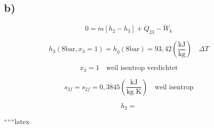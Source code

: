

\subsection*{b)}

\[
0 = \dot{m} \left[ h_2 - h_3 \right] + \dot{Q}_{23} - \dot{W}_k
\]

\[
h_3 (8 \text{bar}, x_3 = 1) = h_g (8 \text{bar}) = 93,42 \left( \frac{\text{kJ}}{\text{kg}} \right) \quad \Delta T
\]

\[
x_3 = 1 \quad \text{weil isentrop verdichtet}
\]

\[
s_{3f} = s_{2f} = 0,3845 \left( \frac{\text{kJ}}{\text{kg K}} \right) \quad \text{weil isentrop}
\]

\[
h_2 =
\]

``````latex